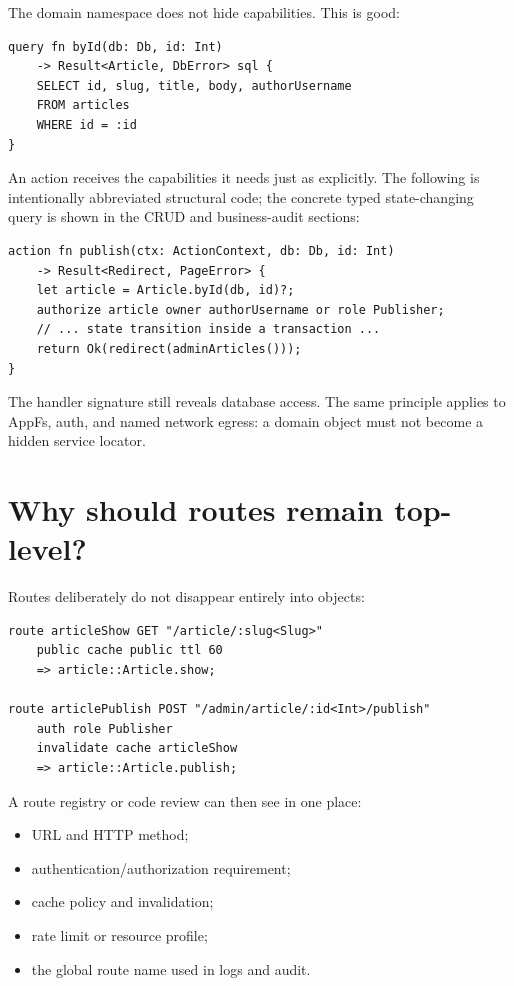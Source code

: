 The domain namespace does not hide capabilities. This is good:

\begin{lstlisting}[language=RWLang]
query fn byId(db: Db, id: Int)
    -> Result<Article, DbError> sql {
    SELECT id, slug, title, body, authorUsername
    FROM articles
    WHERE id = :id
}
\end{lstlisting}

An action receives the capabilities it needs just as explicitly. The following is intentionally abbreviated structural code; the concrete typed state-changing query is shown in the CRUD and business-audit sections:

\begin{lstlisting}
action fn publish(ctx: ActionContext, db: Db, id: Int)
    -> Result<Redirect, PageError> {
    let article = Article.byId(db, id)?;
    authorize article owner authorUsername or role Publisher;
    // ... state transition inside a transaction ...
    return Ok(redirect(adminArticles()));
}
\end{lstlisting}

The handler signature still reveals database access. The same principle applies to AppFs, auth, and named network egress: a domain object must not become a hidden service locator.

\section{Why should routes remain top-level?}

Routes deliberately do not disappear entirely into objects:

\begin{lstlisting}[language=RWLang]
route articleShow GET "/article/:slug<Slug>"
    public cache public ttl 60
    => article::Article.show;

route articlePublish POST "/admin/article/:id<Int>/publish"
    auth role Publisher
    invalidate cache articleShow
    => article::Article.publish;
\end{lstlisting}

A route registry or code review can then see in one place:

\begin{itemize}
  \item URL and HTTP method;
  \item authentication/authorization requirement;
  \item cache policy and invalidation;
  \item rate limit or resource profile;
  \item the global route name used in logs and audit.
\end{itemize}

